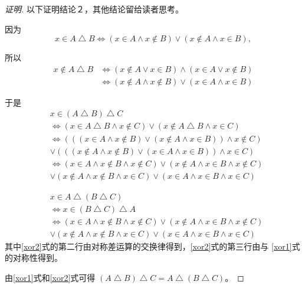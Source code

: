 \begin{proof}[证明]以下证明结论２，其他结论留给读者思考。
  
  因为
  \begin{equation}
  x \in A \bigtriangleup B \Leftrightarrow
  (x \in A \land x \notin B) \lor (x \notin A \land x
  \in B),    
  \end{equation}

  所以
  \begin{equation}
    \begin{split}
      x \notin A \bigtriangleup B &\Leftrightarrow
  (x \notin A \lor x \in B) \land (x \in A \lor x
  \notin B)\\
  &\Leftrightarrow (x \notin A \land x \notin B) \lor (x \in A \land x \in B )
    \end{split}
  \end{equation}

  于是
  \begin{equation}\label{xor1}
    \begin{split}
      &x \in (A \bigtriangleup B) \bigtriangleup C\\
      &\Leftrightarrow (x \in A \bigtriangleup B \land x \notin C) \lor (x \notin A \bigtriangleup B \land x \in C)\\
      &\Leftrightarrow (((x \in A \land x \notin B) \lor (x \notin A \land x \in B)) \land x \notin C)\\
      &\lor (((x \notin A \land x \notin B) \lor (x \in A \land x \in B )) \land x \in C)\\
      &\Leftrightarrow (x \in A \land x \notin B \land x \notin C) \lor (x \notin A \land x \in B \land x \notin C)\\
      &\lor (x \notin A \land x \notin B \land x \in C) \lor (x \in A \land x \in B \land x \in C)
    \end{split}
  \end{equation}

  \begin{equation}\label{xor2}
    \begin{split}
      &x \in A \bigtriangleup (B \bigtriangleup C)\\
      &\Leftrightarrow x \in (B \bigtriangleup C) \bigtriangleup A\\
      &\Leftrightarrow (x \in A \land x \notin B \land x \notin C) \lor (x \notin A \land x \in B \land x \notin C)\\
      &\lor (x \notin A \land x \notin B \land x \in C) \lor (x \in A \land x \in B \land x \in C)
    \end{split}
  \end{equation}
  其中\eqref{xor2}式的第二行由对称差运算的交换律得到，\eqref{xor2}式的第三行由与
   \eqref{xor1}式的对称性得到。

  由\eqref{xor1}式和\eqref{xor2}式可得
  $(A\bigtriangleup B)\bigtriangleup C = A\bigtriangleup (B\bigtriangleup C)$。
\end{proof}


